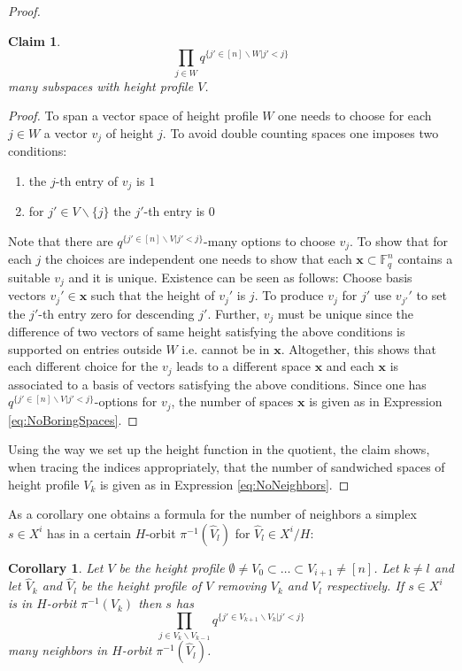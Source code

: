 \documentclass[11pt]{amsart}
\newtheorem{corollary}[theorem]{Corollary}
\newtheorem{claim}{Claim}
\begin{document}
\begin{proof}
\begin{claim}
\begin{equation}
                \prod_{j\in W}q^{\{j'\in [n]\backslash W| j'<j\}}
                \label{eq:NoBoringSpaces}
            \end{equation}
            many subspaces with height profile $V$. 
        \end{claim}
        \begin{proof}
            To span a vector space of height profile $W$ one needs to choose for each $j\in W$ a vector $v_j$ of height $j$. To avoid double counting spaces one imposes two conditions:
            \begin{enumerate}
                \item the $j$-th entry of $v_j$ is $1$
                \item for $j'\in V\backslash\{j\}$ the $j'$-th entry is $0$
            \end{enumerate}
            Note that there are $q^{\{j'\in [n]\backslash V| j'<j\}}$-many options to choose $v_j$. To show that for each $j$ the choices are independent one needs to show that each $\mathbf{x}\subset \mathbb{F}_q^n$ contains a suitable $v_j$ and it is unique. Existence can be seen as follows: Choose basis vectors $v_j'\in \mathbf{x}$ such that the height of $v_j'$ is $j$. To produce $v_j$ for $j'$ use $v_{j'}'$ to set the $j'$-th entry zero for descending $j'$. Further, $v_j$ must be unique since the difference of two vectors of same height satisfying the above conditions is supported on entries outside $W$ i.e. cannot be in $\mathbf{x}$. Altogether, this shows that each different choice for the $v_j$ leads to a different space $\mathbf{x}$ and each $\mathbf{x}$ is associated to a basis of vectors satisfying the above conditions. Since one has $q^{\{j'\in [n]\backslash V| j'<j\}}$-options for $v_j$, the number of spaces $\mathbf{x}$ is given as in Expression \ref{eq:NoBoringSpaces}.
        \end{proof}
        Using the way we set up the height function in the quotient, the claim shows, when tracing the indices appropriately, that the number of sandwiched spaces of height profile $V_k$ is given as in Expression \ref{eq:NoNeighbors}.
    \end{proof}
    As a corollary one obtains a formula for the number of neighbors a simplex $s\in X^i$ has in a certain $H$-orbit $\pi^{-1}(\hat{V}_l)$ for $\hat{V}_l\in X^i/H$:
    \begin{corollary}
        Let $V$ be the height profile $\emptyset \neq V_0\subset \dots \subset V_{i+1}\neq [n]$. Let $k\neq l$ and let $\hat{V}_k$ and $\hat{V}_l$ be the height profile of $V$ removing $V_k$ and $V_l$ respectively. If $s\in X^i$ is in $H$-orbit $\pi^{-1}(V_k)$ then $s$ has
         \begin{equation}
            \prod_{j\in V_k\backslash V_{k-1}}q^{\{j'\in V_{k+1}\backslash V_k|j'<j\}}
            \label{eq:NoNeighbors2}
        \end{equation}
        many neighbors in $H$-orbit $\pi^{-1}(\hat{V}_l)$.
    \end{corollary}
\end{document}
